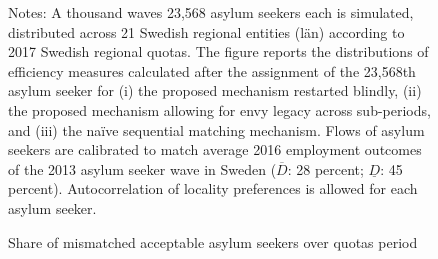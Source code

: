 \documentclass[12pt,fleqn]{article}
\begin{document}
\begin{figure}
	\caption{Share of mismatched acceptable asylum seekers over quotas period \label{FIG-quotas}}
	\begin{center}
	\end{center}
		{\scriptsize \vspace{-1em}
	\begin{singlespace}
		{\sc Notes:} A thousand waves 23,568 asylum seekers each is simulated, distributed across 21 Swedish regional entities (l\"{a}n) according to 2017 Swedish regional quotas. The figure reports the distributions of efficiency measures calculated after the assignment of the 23,568th asylum seeker for (i) the proposed mechanism restarted blindly, (ii) the proposed mechanism allowing for envy legacy across sub-periods, and (iii) the na\"{i}ve sequential matching mechanism. Flows of asylum seekers are calibrated to match average 2016 employment outcomes of the 2013 asylum seeker wave in Sweden ($\overline{D}$: 28 percent; $\underline{D}$: 45 percent). Autocorrelation of locality preferences is allowed for each asylum seeker.
	\end{singlespace}
	 }
\end{figure}
\end{document}
